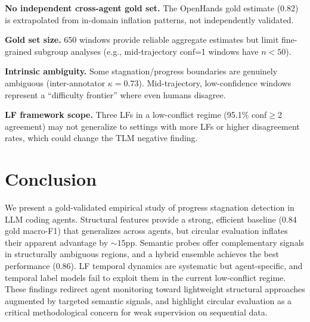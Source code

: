 \documentclass[11pt]{article}
\begin{document}
\textbf{No independent cross-agent gold set.} The OpenHands gold estimate (0.82) is extrapolated from in-domain inflation patterns, not independently validated.

\textbf{Gold set size.} 650 windows provide reliable aggregate estimates but limit fine-grained subgroup analyses (e.g., mid-trajectory conf=1 windows have $n < 50$).

\textbf{Intrinsic ambiguity.} Some stagnation/progress boundaries are genuinely ambiguous (inter-annotator $\kappa{=}0.73$). Mid-trajectory, low-confidence windows represent a ``difficulty frontier'' where even humans disagree.

\textbf{LF framework scope.} Three LFs in a low-conflict regime (95.1\% conf$\geq$2 agreement) may not generalize to settings with more LFs or higher disagreement rates, which could change the TLM negative finding.

\section{Conclusion}
\label{sec:conclusion}

We present a gold-validated empirical study of progress stagnation detection in LLM coding agents.
Structural features provide a strong, efficient baseline (0.84 gold macro-F1) that generalizes across agents, but circular evaluation inflates their apparent advantage by ${\sim}15$pp.
Semantic probes offer complementary signals in structurally ambiguous regions, and a hybrid ensemble achieves the best performance (0.86).
LF temporal dynamics are systematic but agent-specific, and temporal label models fail to exploit them in the current low-conflict regime.
These findings redirect agent monitoring toward lightweight structural approaches augmented by targeted semantic signals, and highlight circular evaluation as a critical methodological concern for weak supervision on sequential data.
\end{document}
